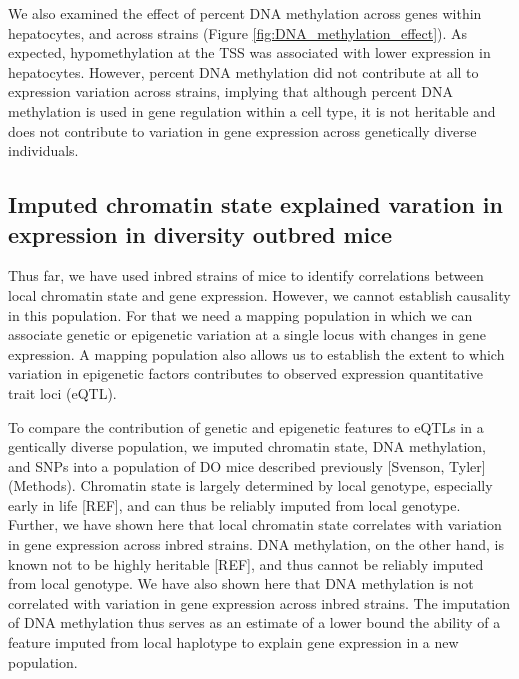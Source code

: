 \documentclass[10pt,letterpaper]{article}
\begin{document}
We also examined the effect of percent DNA methylation across genes
within hepatocytes, and across strains (Figure
\ref{fig:DNA_methylation_effect}). As expected, hypomethylation at the
TSS was associated with lower expression in hepatocytes. However,
percent DNA methylation did not contribute at all to expression
variation across strains, implying that although percent DNA methylation
is used in gene regulation within a cell type, it is not heritable and
does not contribute to variation in gene expression across genetically
diverse individuals.

\hypertarget{imputed-chromatin-state-explained-varation-in-expression-in-diversity-outbred-mice}{%
\subsection{Imputed chromatin state explained varation in expression in
diversity outbred
mice}\label{imputed-chromatin-state-explained-varation-in-expression-in-diversity-outbred-mice}}

Thus far, we have used inbred strains of mice to identify correlations
between local chromatin state and gene expression. However, we cannot
establish causality in this population. For that we need a mapping
population in which we can associate genetic or epigenetic variation at
a single locus with changes in gene expression. A mapping population
also allows us to establish the extent to which variation in epigenetic
factors contributes to observed expression quantitative trait loci
(eQTL).

To compare the contribution of genetic and epigenetic features to eQTLs
in a gentically diverse population, we imputed chromatin state, DNA
methylation, and SNPs into a population of DO mice described previously
{[}Svenson, Tyler{]} (Methods). Chromatin state is largely determined by
local genotype, especially early in life {[}REF{]}, and can thus be
reliably imputed from local genotype. Further, we have shown here that
local chromatin state correlates with variation in gene expression
across inbred strains. DNA methylation, on the other hand, is known not
to be highly heritable {[}REF{]}, and thus cannot be reliably imputed
from local genotype. We have also shown here that DNA methylation is not
correlated with variation in gene expression across inbred strains. The
imputation of DNA methylation thus serves as an estimate of a lower
bound the ability of a feature imputed from local haplotype to explain
gene expression in a new population.
\end{document}
